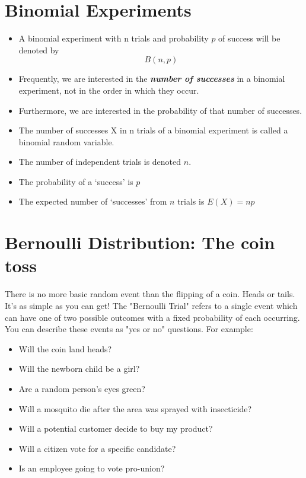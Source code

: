 \documentclass[]{report}
\begin{document}
\section*{Binomial Experiments}
\begin{itemize}
\item A binomial experiment with n trials and
probability $p$ of success will be denoted by
\[B(n, p)\]
\item Frequently, we are interested in the \textbf{\emph{number of successes}} in a binomial experiment, not in the order in which they occur.
\item Furthermore, we are interested in the probability of that number of successes.

\item The number of successes X in n trials of a binomial experiment is called a binomial random variable.
\item The number of independent trials is denoted $n$.
\item The probability of a `success' is $p$
\item The expected number of `successes' from $n$ trials is $E(X) = np$
\end{itemize}


\section*{Bernoulli Distribution: The coin toss}

There is no more basic random event than the flipping of a coin. Heads or tails. It's as simple as you can get! The "Bernoulli Trial" refers to a single event which can have one of two possible outcomes with a fixed probability of each occurring. You can describe these events as "yes or no" questions. For example:

\begin{itemize}
	\item Will the coin land heads?
	\item Will the newborn child be a girl?
	\item Are a random person's eyes green?
	\item Will a mosquito die after the area was sprayed with insecticide?
	\item Will a potential customer decide to buy my product?
	\item Will a citizen vote for a specific candidate?
	\item Is an employee going to vote pro-union?
\end{itemize}
\end{document}
